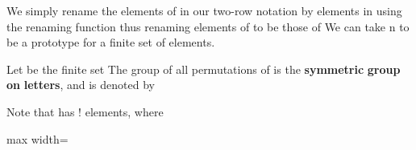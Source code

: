 \documentclass[11pt,oneside]{article}
\begin{document}
\begin{BookBody}
\noindent We simply rename the elements of  in our two-row notation by elements in  using the renaming function  thus renaming elements of  to be those of  We can take  n\BookInline{\}} to be a prototype for a finite set  of  elements.

 Let  be the finite set  The group of all permutations of  is the\textbf{ symmetric} \textbf{group on}  \textbf{letters}, and is denoted by \BookEnd{\blacksquare}

\noindent Note that  has ! elements, where

\begin{center}\begin{adjustbox}{max width=\linewidth}\end{adjustbox}\end{center}

\end{BookBody}

\BookNarrativetrue
\end{document}
